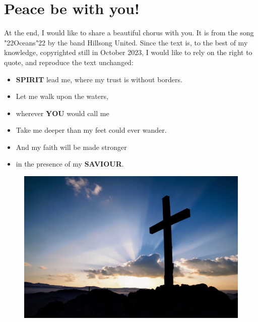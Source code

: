 \documentclass[12pt,a4paper]{article}
\newcommand{\Saviour}[0]{\textbf{SAVIOUR}}
\newcommand{\Spirit}[0]{\textbf{SPIRIT}}
\newcommand{\You}[0]{\textbf{YOU}}
\newcommand{\q}[1]{\char"22{#1}\char"22 }
\begin{document}
	\section{Peace be with you!}
		At the end,
		I would like to share a beautiful chorus with you.
		It is from the song \q{Oceans} by the band Hillsong United.
		Since the text is,
		to the best of my knowledge,
		copyrighted still in October 2023,
		I would like to rely on the right to quote,
		and reproduce the text unchanged:
		\\	
		\begin{itemize}[nosep]
			\item[]	{\Spirit} lead me,
			where my trust is without borders.
			\item[] Let me walk upon the waters,
			\item[] wherever {\You} would call me
			\item[]	Take me deeper than my feet could ever wander.
			\item[]	And my faith will be made stronger
			\item[]	in the presence of my {\Saviour}.
		\end{itemize}
		\begin{figure}[h]
			\centering
			\includegraphics[width=1\textwidth,keepaspectratio]{"FreeChristian.jpeg"}
		\end{figure}
	
\end{document}
